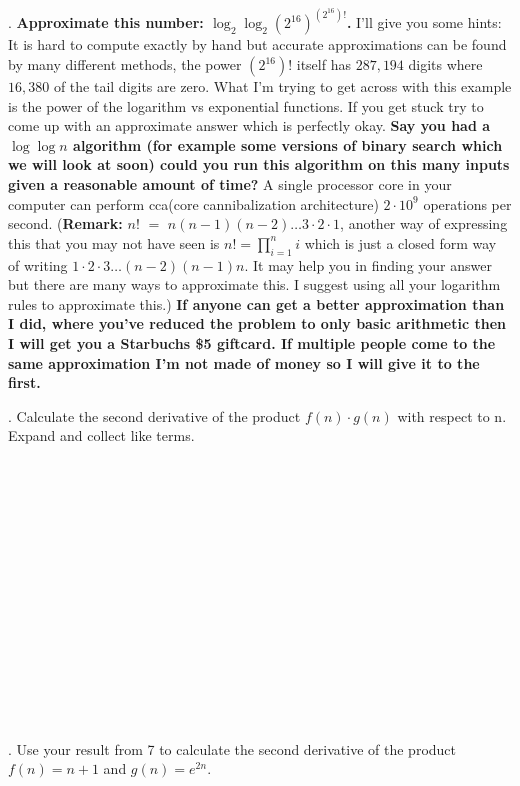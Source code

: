 \documentclass[12pt]{article}
\def\blankpage{%
      \clearpage%
      \thispagestyle{empty}%
      \addtocounter{page}{-1}%
      \null%
      \clearpage}
\begin{document}
\newpage
{}. \textbf{Approximate this number: $\log_{2}{\log_{2}{(2^{16})^{(2^{16})!}}}$.} I'll give you some hints:
It is hard to compute exactly by hand but accurate approximations can be found by many different methods, the power $(2^{16})!$ itself has $287,194$ digits where $16,380$ of the tail digits are zero. 
What I'm trying to get across with this example is the power of the logarithm vs exponential functions. If you get stuck try to come up
with an approximate answer which is perfectly okay. \textbf{Say you had a $\log{\log{n}}$ algorithm (for example some versions of binary search 
which we will look at soon) could you
run this algorithm on this many inputs given a reasonable amount of time?} A single processor core in your computer can perform cca(core cannibalization architecture) $2 \cdot 10^9$ operations per second.
(\textbf{Remark:} $n!$ $=$ $n(n-1)(n-2) \dots 3 \cdot 2 \cdot 1$, another way of expressing this that you may not have seen is $n! = \prod\limits_{i = 1}^{n}i$ which is just a closed form way of writing $1 \cdot 2  \cdot  3 \dots (n-2)(n-1)n$. 
It may help you in finding your answer but there are many ways to approximate this. I suggest using all your logarithm
rules to approximate this.)
\textbf{If anyone can get a better approximation than I did, where you've reduced the problem to
only basic arithmetic then I will get you a Starbuchs \$5 giftcard. If multiple people come to the same 
approximation I'm not made of money so I will give it to the first.}
\blankpage
\newpage
{}. Calculate the second derivative of the product $f(n) \cdot g(n)$ with respect to n. Expand and collect like terms.\\\\\\\\\\\\\\\\\\\\\\\\\\\\\\\\
. Use your result from 7 to calculate the second derivative of the product $f(n) = n + 1$ and $g(n)=e^{2n}$.\\\\\\\\\\\\\\\\\\\\\\\\
\end{document}

